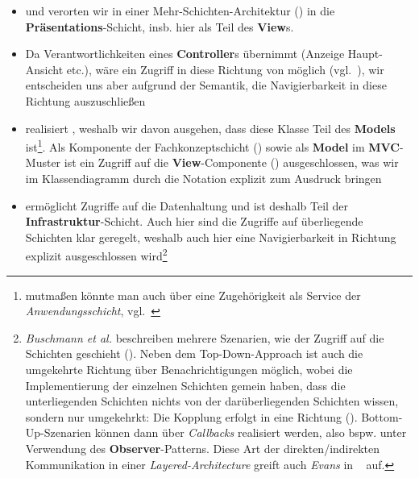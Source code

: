 \begin{itemize}
    \item {} und  verorten wir in einer Mehr-Schichten-Architektur (\cite[31 ff.]{BMRS96}) in die \textbf{Präsentations}-Schicht, insb. hier  als Teil des \textbf{View}s.
    \item[] Da  Verantwortlichkeiten eines \textbf{Controller}s übernimmt (Anzeige Haupt-Ansicht etc.), wäre ein Zugriff in diese Richtung von  möglich (vgl.~\cite[128]{BMRS96}), wir entscheiden uns aber aufgrund der Semantik, die Navigierbarkeit in diese Richtung auszuschließen
    \item {} realisiert , weshalb wir davon ausgehen, dass diese Klasse Teil des \textbf{Models} ist\footnote{
        mutmaßen könnte man auch über eine Zugehörigkeit als Service der \textit{Anwendungsschicht}, vgl.~\cite[70]{Eva03}
    }.
    Als Komponente der Fachkonzeptschicht (\cite[409 f.]{Bal05}) sowie als \textbf{Model} im \textbf{MVC}-Muster ist ein Zugriff auf die \textbf{View}-Componente () ausgeschlossen, was wir im Klassendiagramm durch die Notation explizit zum Ausdruck bringen
    \item {} ermöglicht Zugriffe auf die Datenhaltung und ist deshalb Teil der \textbf{Infrastruktur}-Schicht.
    Auch hier sind die Zugriffe auf überliegende Schichten klar geregelt, weshalb auch hier eine Navigierbarkeit in Richtung  explizit ausgeschlossen wird\footnote{
    \textit{Buschmann et al.} beschreiben mehrere Szenarien, wie der Zugriff auf die Schichten geschieht (\cite[36]{BMRS96}). Neben dem Top-Down-Approach ist   auch die umgekehrte Richtung über Benachrichtigungen möglich, wobei die Implementierung der einzelnen Schichten gemein haben, dass die unterliegenden Schichten nichts von der darüberliegenden Schichten wissen, sondern nur umgekehrkt: Die Kopplung erfolgt in eine Richtung  (\cite[41]{BMRS96}). Bottom-Up-Szenarien können dann über \textit{Callbacks} realisiert werden, also bspw. unter Verwendung des \textbf{Observer}-Patterns.
    Diese Art der direkten/indirekten Kommunikation in einer \textit{Layered-Architecture} greift auch \textit{Evans} in ~\cite[68]{Eva03} auf.
     }
\end{itemize}
